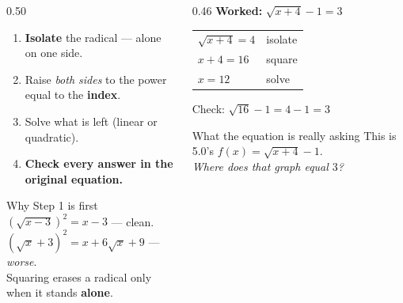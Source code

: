 \documentclass[aspectratio=169, 11pt]{beamer}
\begin{document}
\begin{frame}[t, plain]
  \begin{columns}[T]
    \begin{column}{0.50\textwidth}
      \footnotesize
      \begin{enumerate}\setlength{\itemsep}{4pt}
        \item \textbf{Isolate} the radical --- alone on one side.
        \item Raise \emph{both sides} to the power equal to the \textbf{index}.
        \item Solve what is left (linear or quadratic).
        \item \textbf{Check every answer in the original equation.}
      \end{enumerate}
      \vspace{4pt}
      \begin{block}{Why Step 1 is first}
        $\left(\sqrt{x-3}\right)^{2}=x-3$ \quad --- clean. \\[3pt]
        $\left(\sqrt{x}+3\right)^{2}=x+6\sqrt{x}+9$ \quad --- \emph{worse}. \\[3pt]
        Squaring erases a radical only when it stands \textbf{alone}.
      \end{block}
    \end{column}
    \begin{column}{0.46\textwidth}
      \footnotesize
      \textbf{Worked:} $\sqrt{x+4}-1=3$
      \vspace{3pt}
      \begin{center}
      \renewcommand{\arraystretch}{1.4}
      \begin{tabular}{@{}l l@{}}
      $\sqrt{x+4}=4$ & isolate \\
      $x+4=16$ & square \\
      $x=12$ & solve \\
      \end{tabular}
      \end{center}
      \vspace{3pt}
      Check: $\sqrt{16}-1=4-1=3$ \checkmark
      \vspace{4pt}
      \begin{block}{What the equation is really asking}
        This is 5.0's $f(x)=\sqrt{x+4}-1$. \\[3pt]
        \emph{Where does that graph equal $3$?}
      \end{block}
    \end{column}
  \end{columns}
\end{frame}
\end{document}
